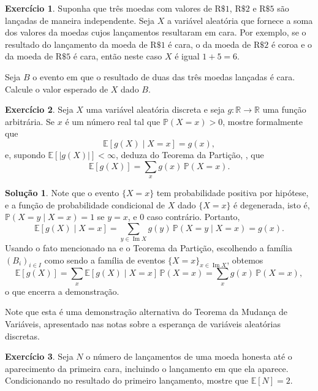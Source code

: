 \documentclass[12pt,portuguese]{article}
\theoremstyle{definition}
\newtheorem{exercise}{Exercício}
\newtheorem*{solution}{Solução}
\begin{document}
\begin{exercise}
Suponha que três moedas com valores de $\mathrm{R}\$1$, $\mathrm{R}\$2$ e $\mathrm{R}\$5$ 
são lançadas de maneira independente. Seja $X$ a variável aleatória que fornece a soma
dos valores da moedas cujos lançamentos resultaram em cara. Por exemplo, se 
o resultado do lançamento da moeda de $\mathrm{R}\$1$ é cara, 
o da moeda de $\mathrm{R}\$2$ é coroa e o da moeda de $\mathrm{R}\$5$ é cara, então
neste caso $X$ é igual $1+5=6$.

Seja $B$ o evento em que o resultado de duas das três moedas lançadas é cara. 
Calcule o valor esperado de $X$ dado $B$.
\end{exercise}


\begin{exercise}\label{exercise:funcao-dada-condicao}
Seja \(X\) uma variável aleatória discreta e seja \(g : \mathbb{R} \to
\mathbb{R}\) uma função arbitrária. Se \(x\) é um número real tal que
\(\mathbb{P}(X = x) > 0\), mostre formalmente que
\[
\mathbb{E}[g(X) \mid X = x] = g(x),
\]
e, supondo \(\mathbb{E}[|g(X)|] < \infty\), deduza do Teorema da Partição,
, que
\[
\mathbb{E}[g(X)] = \sum_x g(x) \, \mathbb{P}(X = x).
\]
\begin{solution}
Note que o evento \(\{X = x\}\) tem probabilidade positiva por
hipótese, e a função de probabilidade condicional de \(X\) dado
\(\{X = x\}\) é degenerada, isto é, \(\mathbb{P}(X = y \mid X = x) = 1\) se
\(y = x\), e \(0\) caso contrário. Portanto,
\[
\mathbb{E}[g(X) \mid X = x]
= \sum_{y \in \operatorname{Im} X} g(y) \, \mathbb{P}(X = y \mid X = x)
= g(x).
\]
Usando o fato mencionado na  e o Teorema da Partição,
escolhendo a família $(B_i)_{i\in I}$ como sendo a 
família de eventos \(\{X = x\}_{x\in \operatorname{Im} X}\), obtemos
\[
\mathbb{E}[g(X)]
= \sum_x \mathbb{E}[g(X) \mid X = x] \, \mathbb{P}(X = x)
= \sum_x g(x) \, \mathbb{P}(X = x),
\]
o que encerra a demonstração. 

Note que esta é uma demonstração alternativa do
Teorema da Mudança de Variáveis, apresentado nas notas sobre a esperança de
variáveis aleatórias discretas.
\end{solution}
\end{exercise}

\begin{exercise}\label{exercise:primeira-cara}
Seja \(N\) o número de lançamentos de uma moeda honesta até o aparecimento
da primeira cara, incluindo o lançamento em que ela aparece. Condicionando
no resultado do primeiro lançamento, mostre que \(\mathbb{E}[N] = 2\).
\end{exercise}
\end{document}
